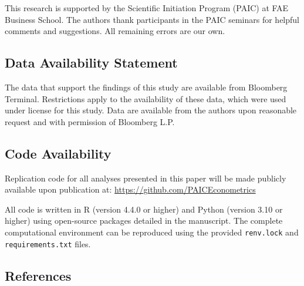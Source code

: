 \documentclass[
  10pt,
  a4paper,
]{article}
\begin{document}
\begin{tcolorbox}
This research is supported by the Scientific Initiation Program (PAIC)
at FAE Business School. The authors thank participants in the PAIC
seminars for helpful comments and suggestions. All remaining errors are
our own.

\subsection{Data Availability
Statement}\label{data-availability-statement}

The data that support the findings of this study are available from
Bloomberg Terminal. Restrictions apply to the availability of these
data, which were used under license for this study. Data are available
from the authors upon reasonable request and with permission of
Bloomberg L.P.

\subsection{Code Availability}\label{code-availability}

Replication code for all analyses presented in this paper will be made
publicly available upon publication at:
\url{https://github.com/PAICEconometrics}

All code is written in R (version 4.4.0 or higher) and Python (version
3.10 or higher) using open-source packages detailed in the manuscript.
The complete computational environment can be reproduced using the
provided \texttt{renv.lock} and \texttt{requirements.txt} files.

\subsection{References}\label{references}

\label{refs}

\end{tcolorbox}
\end{document}
